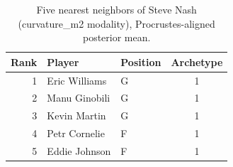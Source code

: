 \begin{table}[htbp]
  \centering\small
  \begin{tabular}{rllc}
    \toprule
    Rank & Player & Position & Archetype \\
    \midrule
    1 & Eric Williams & G & 1 \\
    2 & Manu Ginobili & G & 1 \\
    3 & Kevin Martin & G & 1 \\
    4 & Petr Cornelie & F & 1 \\
    5 & Eddie Johnson & F & 1 \\
    \bottomrule
  \end{tabular}
  \caption{Five nearest neighbors of Steve Nash (curvature_m2 modality), Procrustes-aligned posterior mean.}
  \label{tab:Steve_Nash_neighbors_curvature_m2}
\end{table}

